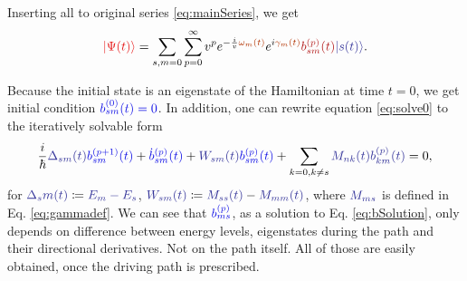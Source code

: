 Inserting all to original series \ref{eq:mainSeries}, we get
\begin{equation}
    \red{\ket{\Psi(t)}}=\sum_{s,m=0}\sum_{p=0}^\infty v^p e^{-\frac{i}{v}\reddd{\omega_m(t)}}e^{i\reddd{\gamma_m(t)}}\redd{b_{sm}^{(p)}(t)}\bluee{\ket{s(t)}}.
    \label{eq:solve0}
\end{equation}

Because the initial state is an eigenstate of the Hamiltonian at time $t=0$, we get initial condition $\blue{b_{sm}^{(0)}(t)=0}$. In addition, one can rewrite equation \ref{eq:solve0} to the iteratively solvable form
\begin{equation}
    \frac{i}{\hbar}\bluee{\Delta_{sm}(t)}\blue{b_{sm}^{(p+1)}(t)}+\blue{\dot b_{sm}^{(p)}(t)}+\bluee{W_{sm}(t)} \blue{b_{sm}^{(p)}(t)}+\sum_{k=0,k\neq s}\bluee{M_{nk}(t)}\bluee{b_{km}^{(p)}(t)}=0,
    \label{eq:bSolution}
\end{equation}
for $\bluee{\Delta_sm(t)}\coloneqq \bluee{E_m-E_s}$, $\bluee{W_{sm}(t)}\coloneqq \bluee{M_{ss}(t)}-\bluee{M_{mm}(t)}$, where $\bluee{M_{ms}}$ is defined in Eq. \ref{eq:gammadef}. We can see that $\blue{b_{ms}^{(p)}}$, as a solution to Eq. \ref{eq:bSolution}, only depends on difference between energy levels, eigenstates during the path and their directional derivatives. Not on the path itself. All of those are easily obtained, once the driving path is prescribed.

















